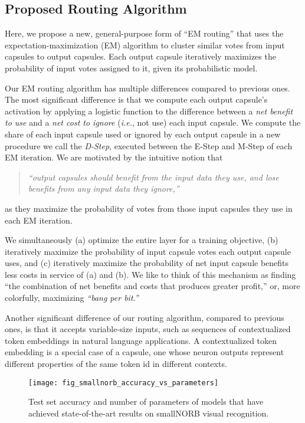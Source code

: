 \documentclass[11pt,a4paper]{article}
\begin{document}
\subsection*{Proposed Routing Algorithm}

Here, we propose a new, general-purpose form of ``EM routing'' \cite{46653} that uses the expectation-maximization (EM) algorithm to cluster similar votes from input capsules to output capsules. Each output capsule iteratively maximizes the probability of input votes assigned to it, given its probabilistic model.

Our EM routing algorithm has multiple differences compared to previous ones. The most significant difference is that we compute each output capsule's activation by applying a logistic function to the difference between a \emph{net benefit to use} and a \emph{net cost to ignore} ({\em i.e.}, not use) each input capsule. We compute the share of each input capsule used or ignored by each output capsule in a new procedure we call the \emph{D-Step}, executed between the E-Step and M-Step of each EM iteration. We are motivated by the intuitive notion that

\begin{quote}
\emph{``output capsules should benefit from the input data they use, and lose benefits from any input data they ignore,''}
\end{quote}

as they maximize the probability of votes from those input capsules they use in each EM iteration.

We simultaneously (a) optimize the entire layer for a training objective, (b) iteratively maximize the probability of input capsule votes each output capsule uses, and (c) iteratively maximize the probability of net input capsule benefits less costs in service of (a) and (b). We like to think of this mechanism as finding ``the combination of net benefits and costs that produces greater profit,'' or, more colorfully, maximizing \emph{``bang per bit.''}

Another significant difference of our routing algorithm, compared to previous ones, is that it accepts variable-size inputs, such as sequences of contextualized token embeddings in natural language applications. A contextualized token embedding is a special case of a capsule, one whose neuron outputs represent different properties of the same token id in different contexts.

\begin{figure}[t]
	\vskip 0.1in
	\begin{center}
		\centerline{\texttt{[image: fig\_smallnorb\_accuracy\_vs\_parameters]}}
		\caption{Test set accuracy and number of parameters of models that have achieved state-of-the-art results on smallNORB visual recognition.}
		\label{fig:smallnorb_accuracy_vs_parameters}
	\end{center}
	\vskip -0.2in
\end{figure} 
\end{document}
